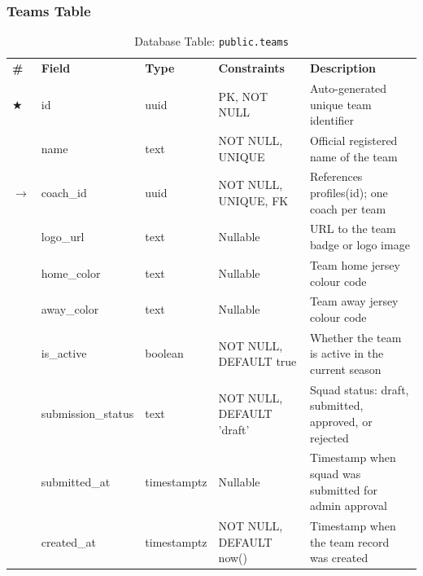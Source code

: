 \documentclass[12pt,a4paper]{report}
\begin{document}
\subsubsection{Teams Table}
\begin{table}[htbp]
\centering
\caption{Database Table: \texttt{public.teams}}
\setlength{\tabcolsep}{4pt}
\begin{tabular}{p{0.4cm}p{3.5cm}p{2.3cm}p{3.0cm}p{4.5cm}}
\rowcolor[HTML]{003087}
{\color{white}\textbf{\#}} &
{\color{white}\textbf{Field}} &
{\color{white}\textbf{Type}} &
{\color{white}\textbf{Constraints}} &
{\color{white}\textbf{Description}} \\
\rowcolor[HTML]{EEF2FF}
$\bigstar$ & id & uuid & PK, NOT NULL & Auto-generated unique team identifier \\
\rowcolor[HTML]{FFFFFF}
 & name & text & NOT NULL, UNIQUE & Official registered name of the team \\
\rowcolor[HTML]{EEF2FF}
$\to$ & coach\_id & uuid & NOT NULL, UNIQUE, FK & References profiles(id); one coach per team \\
\rowcolor[HTML]{FFFFFF}
 & logo\_url & text & Nullable & URL to the team badge or logo image \\
\rowcolor[HTML]{EEF2FF}
 & home\_color & text & Nullable & Team home jersey colour code \\
\rowcolor[HTML]{FFFFFF}
 & away\_color & text & Nullable & Team away jersey colour code \\
\rowcolor[HTML]{EEF2FF}
 & is\_active & boolean & NOT NULL, DEFAULT true & Whether the team is active in the current season \\
\rowcolor[HTML]{FFFFFF}
 & submission\_status & text & NOT NULL, DEFAULT 'draft' & Squad status: draft, submitted, approved, or rejected \\
\rowcolor[HTML]{EEF2FF}
 & submitted\_at & timestamptz & Nullable & Timestamp when squad was submitted for admin approval \\
\rowcolor[HTML]{FFFFFF}
 & created\_at & timestamptz & NOT NULL, DEFAULT now() & Timestamp when the team record was created \\
\end{tabular}
\end{table}
\vspace{4pt}

\end{document}
